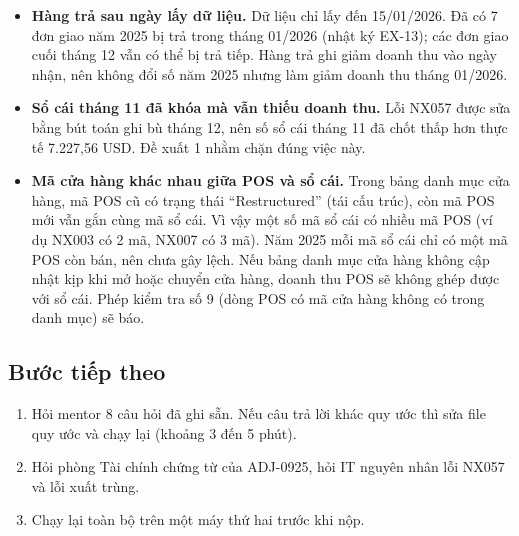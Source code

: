 \begin{itemize}
  \item \textbf{Hàng trả sau ngày lấy dữ liệu.} Dữ liệu chỉ lấy đến 15/01/2026. Đã có 7 đơn giao năm 2025 bị trả trong tháng 01/2026 (nhật ký EX-13); các đơn giao cuối tháng 12 vẫn có thể bị trả tiếp. Hàng trả ghi giảm doanh thu vào ngày nhận, nên không đổi số năm 2025 nhưng làm giảm doanh thu tháng 01/2026.
  \item \textbf{Sổ cái tháng 11 đã khóa mà vẫn thiếu doanh thu.} Lỗi NX057 được sửa bằng bút toán ghi bù tháng 12, nên số sổ cái tháng 11 đã chốt thấp hơn thực tế 7.227,56 USD. Đề xuất 1 nhằm chặn đúng việc này.
  \item \textbf{Mã cửa hàng khác nhau giữa POS và sổ cái.} Trong bảng danh mục cửa hàng, mã POS cũ có trạng thái ``Restructured'' (tái cấu trúc), còn mã POS mới vẫn gắn cùng mã sổ cái. Vì vậy một số mã sổ cái có nhiều mã POS (ví dụ NX003 có 2 mã, NX007 có 3 mã). Năm 2025 mỗi mã sổ cái chỉ có một mã POS còn bán, nên chưa gây lệch. Nếu bảng danh mục cửa hàng không cập nhật kịp khi mở hoặc chuyển cửa hàng, doanh thu POS sẽ không ghép được với sổ cái. Phép kiểm tra số 9 (dòng POS có mã cửa hàng không có trong danh mục) sẽ báo.
\end{itemize}

\subsection{Bước tiếp theo}

\begin{enumerate}
  \item Hỏi mentor 8 câu hỏi đã ghi sẵn. Nếu câu trả lời khác quy ước thì sửa file quy ước và chạy lại (khoảng 3 đến 5 phút).
  \item Hỏi phòng Tài chính chứng từ của ADJ-0925, hỏi IT nguyên nhân lỗi NX057 và lỗi xuất trùng.
  \item Chạy lại toàn bộ trên một máy thứ hai trước khi nộp.
\end{enumerate}
